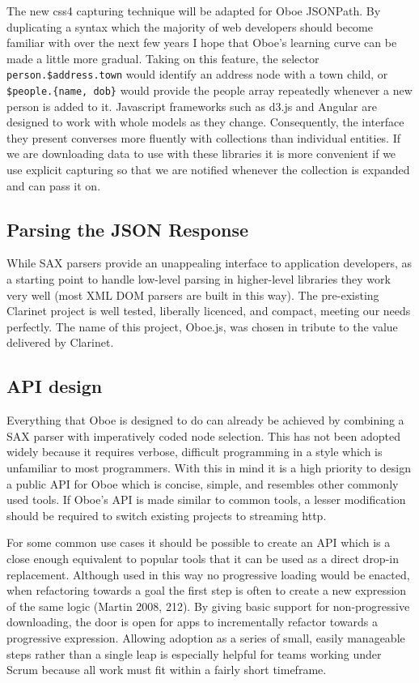 \documentclass[]{article}
\begin{document}
The new css4 capturing technique will be adapted for Oboe JSONPath. By
duplicating a syntax which the majority of web developers should become
familiar with over the next few years I hope that Oboe's learning curve
can be made a little more gradual. Taking on this feature, the selector
\texttt{person.\$address.town} would identify an address node with a
town child, or \texttt{\$people.\{name, dob\}} would provide the people
array repeatedly whenever a new person is added to it. Javascript
frameworks such as d3.js and Angular are designed to work with whole
models as they change. Consequently, the interface they present
converses more fluently with collections than individual entities. If we
are downloading data to use with these libraries it is more convenient
if we use explicit capturing so that we are notified whenever the
collection is expanded and can pass it on.

\subsection{Parsing the JSON Response}

While SAX parsers provide an unappealing interface to application
developers, as a starting point to handle low-level parsing in
higher-level libraries they work very well (most XML DOM parsers are
built in this way). The pre-existing Clarinet project is well tested,
liberally licenced, and compact, meeting our needs perfectly. The name
of this project, Oboe.js, was chosen in tribute to the value delivered
by Clarinet.

\subsection{API design}

Everything that Oboe is designed to do can already be achieved by
combining a SAX parser with imperatively coded node selection. This has
not been adopted widely because it requires verbose, difficult
programming in a style which is unfamiliar to most programmers. With
this in mind it is a high priority to design a public API for Oboe which
is concise, simple, and resembles other commonly used tools. If Oboe's
API is made similar to common tools, a lesser modification should be
required to switch existing projects to streaming http.

For some common use cases it should be possible to create an API which
is a close enough equivalent to popular tools that it can be used as a
direct drop-in replacement. Although used in this way no progressive
loading would be enacted, when refactoring towards a goal the first step
is often to create a new expression of the same logic (Martin 2008,
212). By giving basic support for non-progressive downloading, the door
is open for apps to incrementally refactor towards a progressive
expression. Allowing adoption as a series of small, easily manageable
steps rather than a single leap is especially helpful for teams working
under Scrum because all work must fit within a fairly short timeframe.
\end{document}
